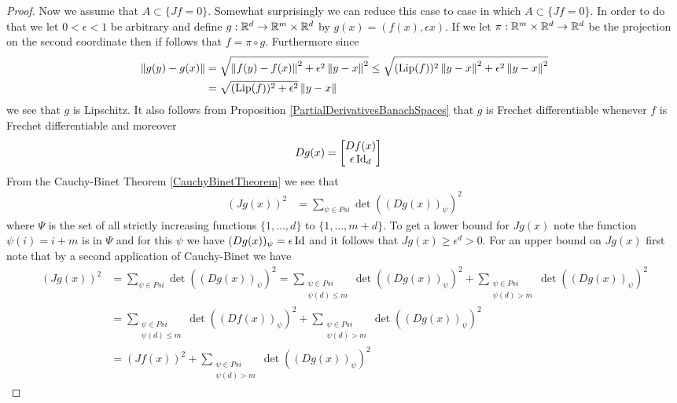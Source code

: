 \begin{proof}
Now we assume that $A \subset \lbrace Jf = 0 \rbrace$.  Somewhat surprisingly we can reduce this case to case in which $A \subset \lbrace Jf = 0 \rbrace$.
In order to do that we let $0 < \epsilon < 1$ be arbitrary and define $g : \mathbb{R}^d \to \mathbb{R}^m \times \mathbb{R}^d$ by $g(x) = (f(x), \epsilon x)$.  If we let $\pi : \mathbb{R}^m \times \mathbb{R}^d \to \mathbb{R}^d$ be the projection on the second coordinate then if follows that $f = \pi \circ g$.  Furthermore since 
\begin{align*}
\left \lVert g(y) - g(x) \right \rVert &= \sqrt{\left \lVert f(y) - f(x) \right \rVert^2 + \epsilon^2\left \lVert y-x \right \rVert^2} \leq \sqrt{(\operatorname*{Lip}(f))^2\left \lVert y - x \right \rVert^2 + \epsilon^2\left \lVert y-x \right \rVert^2} \\
&= \sqrt{(\operatorname*{Lip}(f))^2+ \epsilon^2} \left \lVert y-x \right \rVert
\end{align*}
we see that $g$ is Lipschitz.  It also follows from Proposition \ref{PartialDerivativesBanachSpaces} that $g$ is Frechet differentiable whenever $f$ is Frechet differentiable and moreover
\begin{align*}
Dg(x) &= \begin{bmatrix}
Df(x) \\
\epsilon \operatorname*{Id}_d
\end{bmatrix}
\end{align*}
From the Cauchy-Binet Theorem \ref{CauchyBinetTheorem} we see that
\begin{align*}
(Jg(x))^2 &= \sum_{\psi \in Psi} \det((Dg(x))_\psi)^2
\end{align*}
where $\Psi$ is the set of all strictly increasing functions $\lbrace 1, \dotsc, d\rbrace$ to $\lbrace 1, \dotsc, m+d \rbrace$.  
To get a lower bound for $Jg(x)$ note the function $\psi(i) = i+m$ is in $\Psi$ and for this $\psi$ we have $(Dg(x))_\psi = \epsilon \operatorname*{Id}$ and it follows that
$Jg(x) \geq \epsilon^{d}>0$.  For an upper bound on $Jg(x)$ first note that by a second application of Cauchy-Binet we have
\begin{align*}
(Jg(x))^2 &= \sum_{\psi \in Psi} \det((Dg(x))_\psi)^2 = \sum_{\substack{\psi \in Psi \\ \psi(d) \leq m}} \det((Dg(x))_\psi)^2 + \sum_{\substack{\psi \in Psi \\ \psi(d) > m}} \det((Dg(x))_\psi)^2 \\
&= \sum_{\substack{\psi \in Psi \\ \psi(d) \leq m}} \det((Df(x))_\psi)^2 + \sum_{\substack{\psi \in Psi \\ \psi(d) > m}} \det((Dg(x))_\psi)^2 \\
&= (Jf(x))^2 + \sum_{\substack{\psi \in Psi \\ \psi(d) > m}} \det((Dg(x))_\psi)^2 
\end{align*}


\end{proof}

